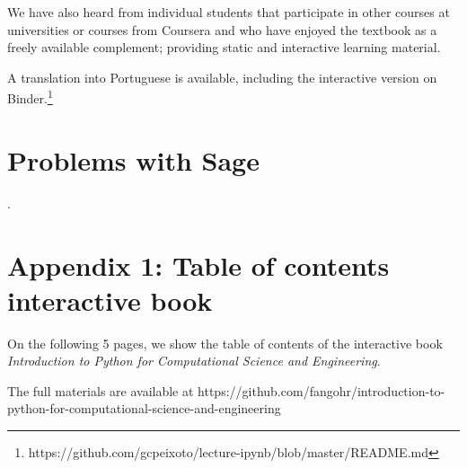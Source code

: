 \documentclass{deliverablereport}
\begin{document}
We have also heard from individual students that participate in other
courses at universities or courses from Coursera and who have enjoyed
the textbook as a freely available complement; providing static and
interactive learning material.

A translation into Portuguese is available, including the interactive
version on Binder.\footnote{https://github.com/gcpeixoto/lecture-ipynb/blob/master/README.md}
\pagebreak
\section{Problems with Sage}
.
\pagebreak
\appendix
\section{Appendix 1: Table of contents interactive book}\label{sec:appendix-1}

On the following 5 pages, we show the table of contents of the
interactive book \emph{Introduction to Python for Computational
  Science and Engineering}.

The full materials are available at
\newline
https://github.com/fangohr/introduction-to-python-for-computational-science-and-engineering


\end{document}
